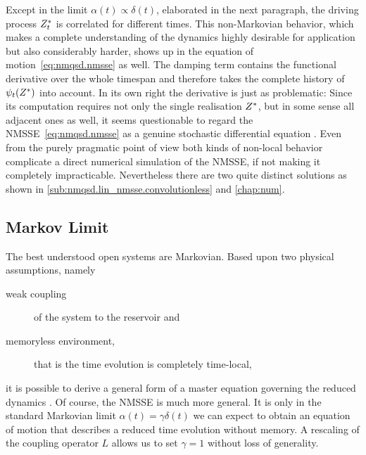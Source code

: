 Except in the limit $\alpha(t) \propto \delta(t)$, elaborated in the next paragraph, the driving process ${Z}^*_t$ is correlated for different times.
This non-Markovian behavior, which makes a complete understanding of the dynamics highly desirable for application but also considerably harder, shows up in the equation of motion~\ref{eq:nmqsd.nmsse} as well.
The damping term contains the functional derivative over the whole timespan and therefore takes the complete history of $\psi_t({Z}^*)$ into account.
In its own right the derivative is just as problematic:
Since its computation requires not only the single realisation ${Z}^*$, but in some sense all adjacent ones as well, it seems questionable to regard the NMSSE~\ref{eq:nmqsd.nmsse} as a genuine stochastic differential equation \cite{GaWi02_real_nmsse}.
Even from the purely pragmatic point of view both kinds of non-local behavior complicate a direct numerical simulation of the NMSSE, if not making it completely impracticable.
Nevertheless there are two quite distinct solutions as shown in \autoref{sub:nmqsd.lin_nmsse.convolutionless} and \autoref{chap:num}.


\subsection{Markov Limit}
\label{sub:nmqsd.markov}
%

The best understood open systems are Markovian.
Based upon two physical assumptions, namely
\begin{description}
  \item[weak coupling] of the system to the reservoir and
  \item[memoryless environment,] that is the time evolution is completely time-local,
\end{description}
it is possible to derive a general form of a master equation governing the reduced dynamics \cite{Li76_generators_qdsg}.
Of course, the NMSSE is much more general.
It is only in the standard Markovian limit $\alpha(t) = \gamma\delta(t)$ we can expect to obtain an equation of motion that describes a reduced time evolution without memory.
A rescaling of the coupling operator $L$ allows us to set $\gamma = 1$ without loss of generality.

